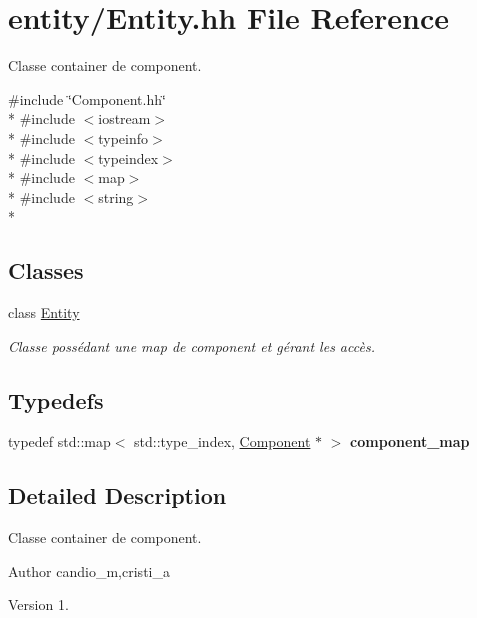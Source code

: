 \hypertarget{_entity_8hh}{}\section{entity/\+Entity.hh File Reference}
\label{_entity_8hh}


Classe container de component.  


{\ttfamily \#include \char`\"{}Component.\+hh\char`\"{}}\\*
{\ttfamily \#include $<$iostream$>$}\\*
{\ttfamily \#include $<$typeinfo$>$}\\*
{\ttfamily \#include $<$typeindex$>$}\\*
{\ttfamily \#include $<$map$>$}\\*
{\ttfamily \#include $<$string$>$}\\*
\subsection*{Classes}
\begin{DoxyCompactItemize}
\item 
class \hyperlink{class_entity}{Entity}
\begin{DoxyCompactList}\small\item\em Classe possédant une map de component et gérant les accès. \end{DoxyCompactList}\end{DoxyCompactItemize}
\subsection*{Typedefs}
\begin{DoxyCompactItemize}
\item 
\hypertarget{_entity_8hh_a5cad391458ba3505053b2a059b0938fb}{}typedef std\+::map$<$ std\+::type\+\_\+index, \hyperlink{class_component}{Component} $\ast$ $>$ {\bfseries component\+\_\+map}\label{_entity_8hh_a5cad391458ba3505053b2a059b0938fb}

\end{DoxyCompactItemize}


\subsection{Detailed Description}
Classe container de component. 

\begin{DoxyAuthor}{Author}
candio\+\_\+m,cristi\+\_\+a 
\end{DoxyAuthor}
\begin{DoxyVersion}{Version}
1. 
\end{DoxyVersion}
